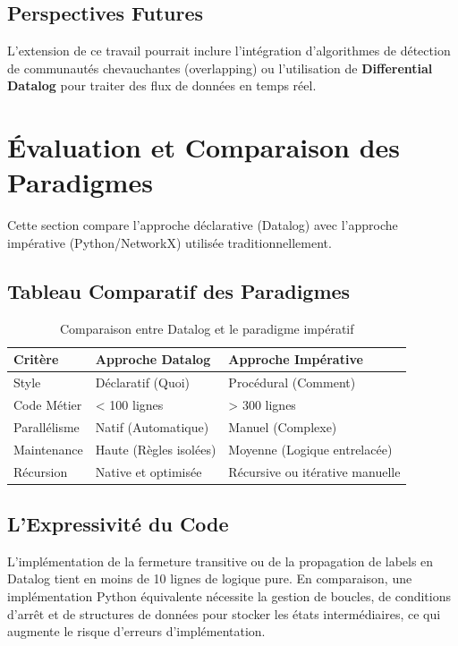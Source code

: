 \documentclass[12pt,a4paper]{report}
\begin{document}
\section{Perspectives Futures}
L'extension de ce travail pourrait inclure l'intégration d'algorithmes de détection de communautés chevauchantes (overlapping) ou l'utilisation de \textbf{Differential Datalog} pour traiter des flux de données en temps réel.

\chapter{Évaluation et Comparaison des Paradigmes}
Cette section compare l'approche déclarative (Datalog) avec l'approche impérative (Python/NetworkX) utilisée traditionnellement.

\section{Tableau Comparatif des Paradigmes}
\begin{table}[h!]
\centering
\begin{tabularx}{\textwidth}{@{}lXX@{}}
\toprule
\textbf{Critère} & \textbf{Approche Datalog} & \textbf{Approche Impérative} \\ \midrule
Style & Déclaratif (Quoi) & Procédural (Comment) \\
Code Métier & < 100 lignes & > 300 lignes \\
Parallélisme & Natif (Automatique) & Manuel (Complexe) \\
Maintenance & Haute (Règles isolées) & Moyenne (Logique entrelacée) \\
Récursion & Native et optimisée & Récursive ou itérative manuelle \\ \bottomrule
\end{tabularx}
\caption{Comparaison entre Datalog et le paradigme impératif}
\label{tab:comparison}
\end{table}

\section{L'Expressivité du Code}
L'implémentation de la fermeture transitive ou de la propagation de labels en Datalog tient en moins de 10 lignes de logique pure. En comparaison, une implémentation Python équivalente nécessite la gestion de boucles, de conditions d'arrêt et de structures de données pour stocker les états intermédiaires, ce qui augmente le risque d'erreurs d'implémentation.
\end{document}
